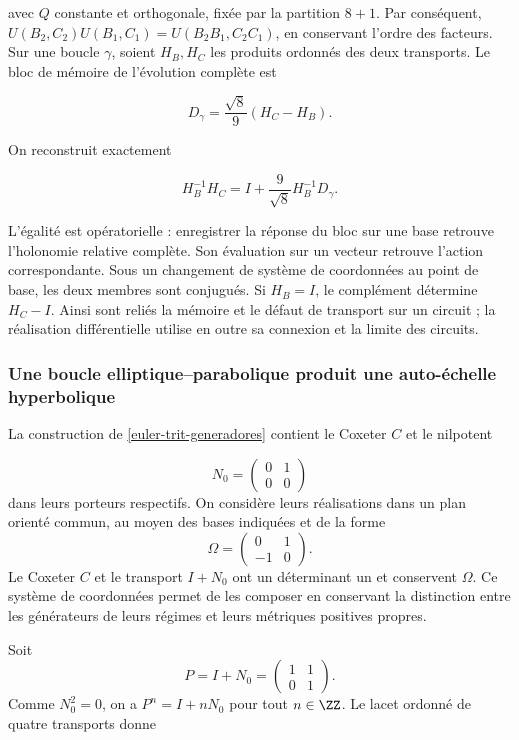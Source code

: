 avec \(Q\) constante et orthogonale, fixée par la partition \(8+1\).
Par conséquent,
\(U(B_2,C_2)U(B_1,C_1)=U(B_2B_1,C_2C_1)\),
en conservant l’ordre des facteurs.
Sur une boucle \(\gamma\), soient \(H_B,H_C\) les produits
ordonnés des deux transports.
Le bloc de mémoire de l’évolution complète est




\[
D_\gamma=\frac{\sqrt8}{9}(H_C-H_B).
\]



On reconstruit exactement



\begin{equation}
\boxed{H_B^{-1}H_C=I+\frac9{\sqrt8}H_B^{-1}D_\gamma.}
\label{nuc11:eq:25}
\end{equation}



L’égalité est opératorielle : enregistrer la réponse du bloc
sur une base retrouve l’holonomie relative complète.
Son évaluation sur un vecteur retrouve l’action correspondante.
Sous un changement de système de coordonnées au point de base, les deux membres sont conjugués.
Si \(H_B=I\), le complément détermine \(H_C-I\).
Ainsi sont reliés la mémoire et le défaut de transport sur un
circuit ; la réalisation différentielle utilise en outre
sa connexion et la limite des circuits.

\subsubsection{Une boucle elliptique–parabolique produit une auto-échelle hyperbolique
}

La construction de \cref{euler-trit-generadores} contient le
Coxeter \(C\) et le nilpotent

\[
 N_0=\begin{pmatrix}0&1\\0&0\end{pmatrix}
\]
dans leurs porteurs respectifs.
On considère leurs réalisations dans un plan orienté commun,
au moyen des bases indiquées et de la forme
\[
 \Omega=\begin{pmatrix}0&1\\-1&0\end{pmatrix}.
\]
Le Coxeter \(C\) et le transport \(I+N_0\) ont un déterminant
un et conservent \(\Omega\).
Ce système de coordonnées permet de les composer en conservant la distinction entre
les générateurs de leurs régimes et leurs métriques positives propres.

Soit
\[
 P=I+N_0=\begin{pmatrix}1&1\\0&1\end{pmatrix}.
\]
Comme \(N_0^2=0\), on a \(P^n=I+nN_0\) pour tout
\(n\in\ZZ\).
Le lacet ordonné de quatre transports donne



